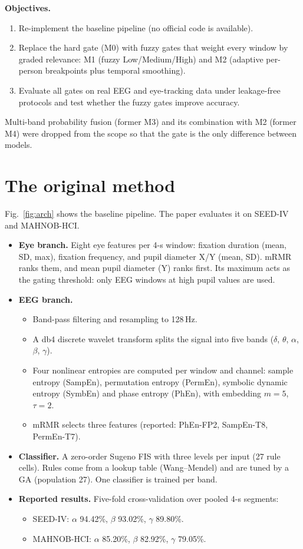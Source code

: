 \documentclass[10pt,a4paper]{article}
\begin{document}
\textbf{Objectives.}
\begin{enumerate}
  \item Re-implement the baseline pipeline (no official code is available).
  \item Replace the hard gate (M0) with fuzzy gates that weight every window by graded relevance: M1 (fuzzy Low/Medium/High) and M2 (adaptive per-person breakpoints plus temporal smoothing).
  \item Evaluate all gates on real EEG and eye-tracking data under leakage-free protocols and test whether the fuzzy gates improve accuracy.
\end{enumerate}
Multi-band probability fusion (former M3) and its combination with M2 (former M4) were dropped from the scope so that the gate is the only difference between models.

\section{The original method}
Fig.~\ref{fig:arch} shows the baseline pipeline. The paper evaluates it on SEED-IV and MAHNOB-HCI.
\begin{itemize}
  \item \textbf{Eye branch.} Eight eye features per 4-s window: fixation duration (mean, SD, max), fixation frequency, and pupil diameter X/Y (mean, SD). mRMR ranks them, and mean pupil diameter (Y) ranks first. Its maximum acts as the gating threshold: only EEG windows at high pupil values are used.
  \item \textbf{EEG branch.}
    \begin{itemize}
      \item Band-pass filtering and resampling to 128\,Hz.
      \item A db4 discrete wavelet transform splits the signal into five bands ($\delta$, $\theta$, $\alpha$, $\beta$, $\gamma$).
      \item Four nonlinear entropies are computed per window and channel: sample entropy (SampEn), permutation entropy (PermEn), symbolic dynamic entropy (SymbEn) and phase entropy (PhEn), with embedding $m{=}5$, $\tau{=}2$.
      \item mRMR selects three features (reported: PhEn-FP2, SampEn-T8, PermEn-T7).
    \end{itemize}
  \item \textbf{Classifier.} A zero-order Sugeno FIS with three levels per input (27 rule cells). Rules come from a lookup table (Wang--Mendel) and are tuned by a GA (population 27). One classifier is trained per band.
  \item \textbf{Reported results.} Five-fold cross-validation over pooled 4-s segments:
    \begin{itemize}
      \item SEED-IV: $\alpha$ 94.42\%, $\beta$ 93.02\%, $\gamma$ 89.80\%.
      \item MAHNOB-HCI: $\alpha$ 85.20\%, $\beta$ 82.92\%, $\gamma$ 79.05\%.
    \end{itemize}
\end{itemize}
\end{document}

